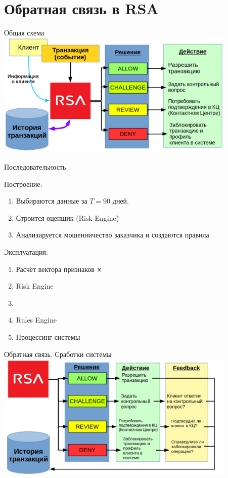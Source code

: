 \section{Обратная связь в RSA}\label{section:rsa_feedback}

\begin{frame}{Общая схема} 
	\includegraphics[width=11.5cm]{../pic/expert_system_rsa.png}
\end{frame}

\begin{frame}{Последовательность}
	
	Построение:
	\begin{enumerate}
		\item Выбираются данные за $T=90$ дней.
		\item Строится оценщик (Risk Engine)
		\item Анализируется мошенничество заказчика и создаются правила
	\end{enumerate}

	Эксплуатация:
	\begin{enumerate}
		\item Расчёт вектора признаков $\bold x$
		\item Risk Engine
			\item 
		\item Rules Engine
		\item Процессинг системы
	\end{enumerate}

\end{frame}

\begin{frame}{Обратная связь. Сработки системы}\label{frame:rsa_feedback}
\includegraphics[width=11.5cm]{../pic/expert_system_rsa_feedback.png}
\end{frame}


